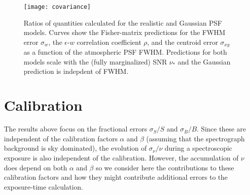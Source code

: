 \documentclass[11pt]{article}
\begin{document}
\begin{figure}[h]
\begin{center}
\texttt{[image: covariance]}
\caption{Ratios of quantities calculated for the realistic and Gaussian PSF models.  Curves show the Fisher-matrix predictions for the FWHM error $\sigma_w$, the $\epsilon$-$w$ correlation coefficient $\rho$, and the centroid error $\sigma_{xy}$ as a function of the atmospheric PSF FWHM. Predictions for both models scale with the (fully marginalized) SNR $\nu_\ast$ and the Gaussian prediction is indepdent of FWHM.}
\label{fig:covariance}
\end{center}
\end{figure}

\section{Calibration}

The results above focus on the fractional errors $\sigma_S/S$ and $\sigma_B/B$. Since these are independent of the calibration factors $\alpha$ and $\beta$ (assuming that the spectrograph background is sky dominated), the evolution of $\sigma_\nu/\nu$ during a spectroscopic exposure is also independent of the calibration. However, the accumulation of $\nu$ does depend on both $\alpha$ and $\beta$ so we consider here the contributions to these calibration factors and how they might contribute additional errors to the exposure-time calculation.
\end{document}
